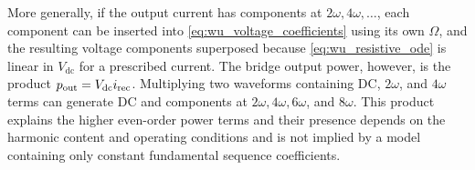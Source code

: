 More generally, if the output current has components at \(2\omega,4\omega,\ldots\), each component can be inserted into \eqref{eq:wu_voltage_coefficients} using its own \(\Omega\), and the resulting voltage components superposed because \eqref{eq:wu_resistive_ode} is linear in \(V_{\mathrm{dc}}\) for a prescribed current. The bridge output power, however, is the product \(p_{\mathrm{out}}=V_{\mathrm{dc}}i_{\rm rec}\). Multiplying two waveforms containing DC, \(2\omega\), and \(4\omega\) terms can generate DC and components at \(2\omega,4\omega,6\omega\), and \(8\omega\). This product explains the higher even-order power terms and their presence depends on the harmonic content and operating conditions and is not implied by a model containing only constant fundamental sequence coefficients.


